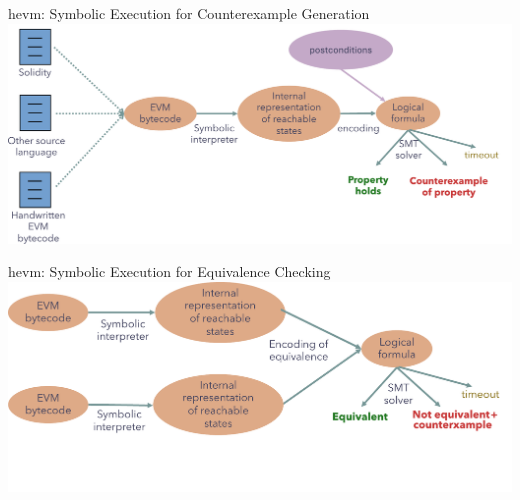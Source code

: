 \documentclass[aspectratio=169]{beamer}
\begin{document}
\begin{frame}{hevm: Symbolic Execution for Counterexample Generation}
\centering
\includegraphics[scale=0.45]{pipeline}
\end{frame}

\begin{frame}{hevm: Symbolic Execution for Equivalence Checking}
\centering
\includegraphics[scale=0.45]{equivalence-pipeline}
\end{frame}
%
%
%
%
\end{document}
